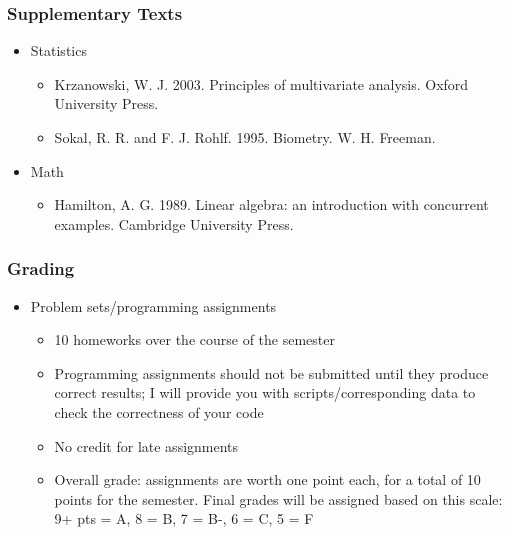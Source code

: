\documentclass{beamer}
\begin{document}
\begin{frame}
  \frametitle{Supplementary Texts}
\begin{itemize}


\item Statistics
\begin{itemize}
	\item Krzanowski, W. J. 2003. Principles of multivariate analysis. Oxford University Press.
	\item Sokal, R. R. and F. J. Rohlf. 1995. Biometry. W. H. Freeman.
\end{itemize}

\item Math
\begin{itemize}
	\item Hamilton, A. G. 1989. Linear algebra: an introduction with concurrent examples. Cambridge University Press.
\end{itemize}

\end{itemize}

\end{frame}

\begin{frame}
  \frametitle{Grading}
\begin{itemize}
\item Problem sets/programming assignments
\begin{itemize}
	\item 10 homeworks over the course of the semester
	\item Programming assignments should not be submitted until they produce correct results; I will provide you with scripts/corresponding data to check the correctness of your code
	\item No credit for late assignments
	\item Overall grade: assignments are worth one point each, for a total of 10 points for the semester. \alert{Final grades will be assigned based on this scale: 9+ pts = A, 8 = B, 7 = B-, 6 = C, 5 = F}
\end{itemize}

\end{itemize}

\end{frame}
\end{document}
